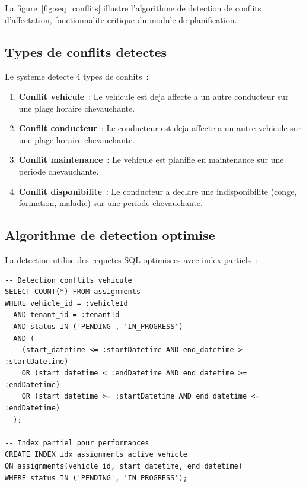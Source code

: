 \documentclass[12pt,a4paper]{report}
\begin{document}
\begin{enumerate}[leftmargin=2cm]
La figure~\ref{fig:seq_conflits} illustre l'algorithme de detection
de conflits d'affectation, fonctionnalite critique du module de planification.

\subsection{Types de conflits detectes}

Le systeme detecte 4 types de conflits~:

\begin{enumerate}[leftmargin=2cm]
  \item \textbf{Conflit vehicule}~: Le vehicule est deja affecte a un autre
        conducteur sur une plage horaire chevauchante.
        
  \item \textbf{Conflit conducteur}~: Le conducteur est deja affecte a un
        autre vehicule sur une plage horaire chevauchante.
        
  \item \textbf{Conflit maintenance}~: Le vehicule est planifie en maintenance
        sur une periode chevauchante.
        
  \item \textbf{Conflit disponibilite}~: Le conducteur a declare une
        indisponibilite (conge, formation, maladie) sur une periode chevauchante.
\end{enumerate}

\subsection{Algorithme de detection optimise}

La detection utilise des requetes SQL optimisees avec index partiels~:

\begin{verbatim}
-- Detection conflits vehicule
SELECT COUNT(*) FROM assignments
WHERE vehicle_id = :vehicleId
  AND tenant_id = :tenantId
  AND status IN ('PENDING', 'IN_PROGRESS')
  AND (
    (start_datetime <= :startDatetime AND end_datetime > :startDatetime)
    OR (start_datetime < :endDatetime AND end_datetime >= :endDatetime)
    OR (start_datetime >= :startDatetime AND end_datetime <= :endDatetime)
  );

-- Index partiel pour performances
CREATE INDEX idx_assignments_active_vehicle
ON assignments(vehicle_id, start_datetime, end_datetime)
WHERE status IN ('PENDING', 'IN_PROGRESS');
\end{verbatim}


\end{enumerate}
\end{document}
